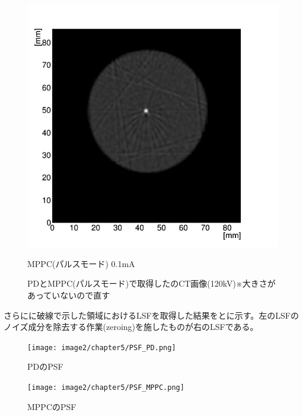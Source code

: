 \begin{figure}[H]
\begin{minipage}{0.5\hsize}
\begin{center}
 \includegraphics[bb=0.000000 0.000000 346.531353 333.572425,width=1\hsize]{image2/chapter5/CT_MTF_MPPCpulse.png} 
  \end{center}
  \vspace{-1cm}
  \caption*{MPPC(パルスモード) 0.1mA}
 \end{minipage}
 \begin{center}
  \caption{PDとMPPC(パルスモード)で取得したのCT画像(120kV)※大きさがあっていないので直す}
  \label{fig:CT_MTF}
  \end{center}
\end{figure}

さらにに破線で示した領域におけるLSFを取得した結果をとに示す。左のLSFのノイズ成分を除去する作業(zeroing)を施したものが右のLSFである。


\begin{figure}[H]
 \begin{center}
 \texttt{[image: image2/chapter5/PSF\_PD.png]} 
 \end{center}
 \caption{PDのPSF}
 \label{fig:PSF_PD}
\end{figure}


\begin{figure}[H]
 \begin{center}
 \texttt{[image: image2/chapter5/PSF\_MPPC.png]} 
 \end{center}
 \caption{MPPCのPSF}
 \label{fig:PSF_MPPC}
\end{figure}


